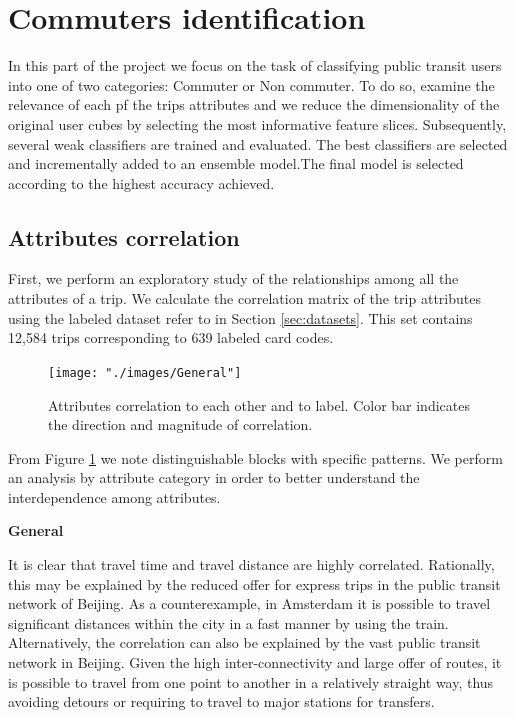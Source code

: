 \documentclass{article}
\begin{document}
\newpage
\section{Commuters identification}
\label{sec:partII}
In this part of the project we focus on the task of classifying public transit users into one of two categories: Commuter or Non commuter. To do so, examine the relevance of each pf the trips attributes and we reduce the dimensionality of the original user cubes by selecting the most informative feature slices. Subsequently, several weak classifiers are trained and evaluated. The best classifiers are selected and incrementally added to an ensemble model.The final model is selected according to the highest accuracy achieved.

\subsection{Attributes correlation} 
First, we perform an exploratory study of the relationships among all the attributes of a trip. We calculate the correlation matrix of the trip attributes using the labeled dataset refer to in Section \ref{sec:datasets}. This set contains 12,584 trips corresponding to 639 labeled card codes.

\begin{figure}[H]
  \centering
  \texttt{[image: "./images/General"]}
  \caption{Attributes correlation to each other and to label. Color bar indicates the direction and magnitude of correlation.}
  \label{fig:classification/correlation}
\end{figure}

From Figure \ref{fig:classification/correlation} we note distinguishable blocks with specific patterns. We perform an analysis by attribute category in order to better understand the interdependence among attributes.

\textbf{General} 

It is clear that travel time and travel distance are highly correlated. Rationally, this may be explained by the reduced offer for express trips in the public transit network of Beijing. As a counterexample, in Amsterdam it is possible to travel significant distances within the city in a fast manner by using the train. Alternatively, the correlation can also be explained by the vast public transit network in Beijing. Given the high inter-connectivity and large offer of routes, it is possible to travel from one point to another in a relatively straight way, thus avoiding detours or requiring to travel to major stations for transfers. 
 
\end{document}
